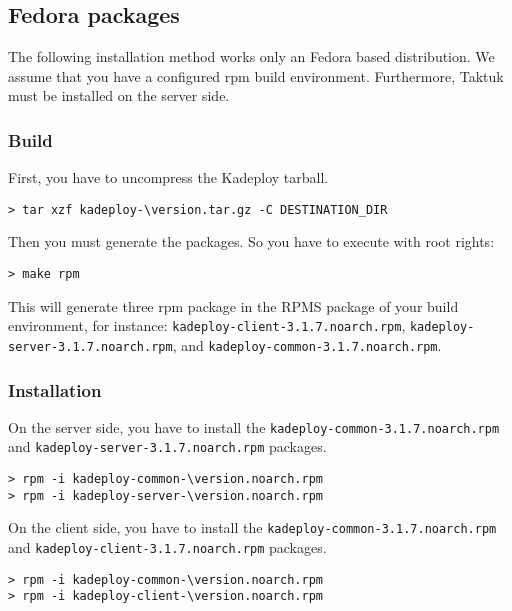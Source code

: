 \documentclass[a4wide,10pt,oneside]{book}
\newcommand{\version}{3.1.7}
\begin{document}
\subsection{Fedora packages}
The following installation method works only an Fedora based distribution. We assume that you have a configured rpm build environment. Furthermore, Taktuk must be installed on the server side.
\subsubsection{Build}
\noindent First, you have to uncompress the Kadeploy tarball.
\begin{small}
\begin{Verbatim}[commandchars=\\\{\}]
> tar xzf kadeploy-\version.tar.gz -C DESTINATION_DIR
\end{Verbatim}
\end{small}

\noindent Then you must generate the packages. So you have to execute with root rights:
\begin{small}
\begin{verbatim}
> make rpm
\end{verbatim}
\end{small}
This will generate three rpm package in the RPMS package of your build environment, for instance: \texttt{kadeploy-client-\version.noarch.rpm}, \texttt{kadeploy-server-\version.noarch.rpm}, and \texttt{kadeploy-common-\version.noarch.rpm}.
\subsubsection{Installation}
\noindent On the server side, you have to install the \texttt{kadeploy-common-\version.noarch.rpm} and \texttt{kadeploy-server-\version.noarch.rpm} packages.
\begin{small}
\begin{Verbatim}[commandchars=\\\{\}]
> rpm -i kadeploy-common-\version.noarch.rpm
> rpm -i kadeploy-server-\version.noarch.rpm
\end{Verbatim}
\end{small}

\noindent On the client side, you have to install the \texttt{kadeploy-common-\version.noarch.rpm} and \texttt{kadeploy-client-\version.noarch.rpm} packages.
\begin{small}
\begin{Verbatim}[commandchars=\\\{\}]
> rpm -i kadeploy-common-\version.noarch.rpm
> rpm -i kadeploy-client-\version.noarch.rpm
\end{Verbatim}
\end{small}
\end{document}

